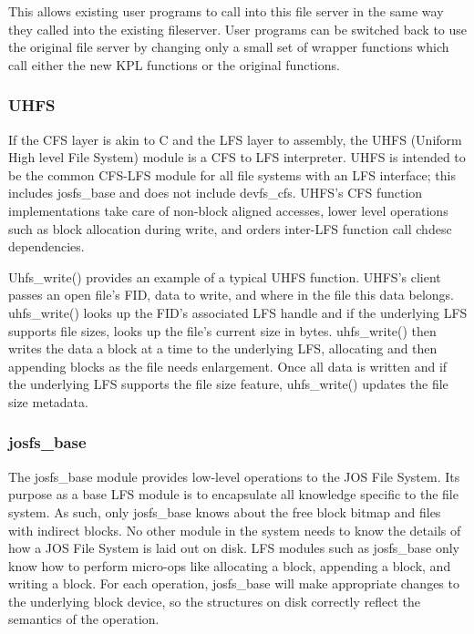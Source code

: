 This allows existing user programs to call into this file server in the same way
they called into the existing fileserver. User programs can be switched back to
use the original file server by changing only a small set of wrapper functions
which call either the new KPL functions or the original functions.

\subsubsection{UHFS}
\label{sec:solution:impl:uhfs}

If the CFS layer is akin to C and the LFS layer to assembly, the UHFS (Uniform
High level File System) module is a CFS to LFS interpreter. UHFS is intended to
be the common CFS-LFS module for all file systems with an LFS interface; this
includes josfs\_base and does not include devfs\_cfs. UHFS's CFS function
implementations take care of non-block aligned accesses, lower level operations
such as block allocation during write, and orders inter-LFS function call chdesc
dependencies.

Uhfs\_write() provides an example of a typical UHFS function. UHFS's client
passes an open file's FID, data to write, and where in the file this data
belongs. uhfs\_write() looks up the FID's associated LFS handle and if the
underlying LFS supports file sizes, looks up the file's current size in bytes.
uhfs\_write() then writes the data a block at a time to the underlying LFS,
allocating and then appending blocks as the file needs enlargement. Once all
data is written and if the underlying LFS supports the file size feature,
uhfs\_write() updates the file size metadata.

\subsubsection{josfs\_base}
\label{sec:solution:impl:base}

The josfs\_base module provides low-level operations to the JOS File System.
Its purpose as a base LFS module is to encapsulate all knowledge specific to the
file system. As such, only josfs\_base knows about the free block bitmap and
files with indirect blocks. No other module in the system needs to know the
details of how a JOS File System is laid out on disk. LFS modules such as
josfs\_base only know how to perform micro-ops like allocating a block,
appending a block, and writing a block. For each operation, josfs\_base will
make appropriate changes to the underlying block device, so the structures on
disk correctly reflect the semantics of the operation.

